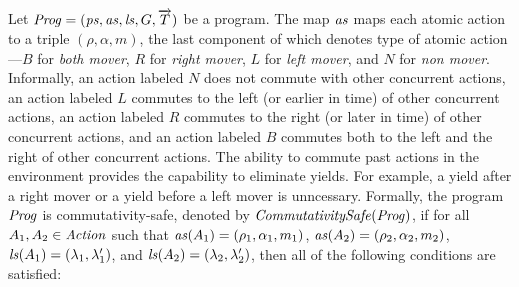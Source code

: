 Let $\mathit{Prog} = (\mathit{ps}, \mathit{as}, \mathit{ls}, G, \overrightarrow{T})$ be a program.
The map $\mathit{as}$ maps each atomic action to a triple $(\rho, \alpha, m)$, the last component of which 
denotes type of atomic action---$B$ for {\em both mover}, $R$ for {\em right mover}, $L$ for {\em left mover},
and $N$ for {\em non mover}.
Informally, an action labeled $N$ does not commute with other concurrent actions,
an action labeled $L$ commutes to the left (or earlier in time) of other concurrent actions,
an action labeled $R$ commutes to the right (or later in time) of other concurrent actions,
and an action labeled $B$ commutes both to the left and the right of other concurrent actions.
The ability to commute past actions in the environment provides the capability to eliminate yields.
For example, a yield after a right mover or a yield before a left mover is unncessary.
Formally, the program $\mathit{Prog}$ is commutativity-safe, denoted by $\mathit{CommutativitySafe}(\mathit{Prog})$,
if for all $A_1,A_2 \in \mathit{Action}$ such that $\mathit{as}(A_1) = (\rho_1,\alpha_1,m_1)$, $\mathit{as}(A_2) = (\rho_2,\alpha_2,m_2)$,
$\mathit{ls}(A_1) = (\lambda_1,\lambda'_1)$, and $\mathit{ls}(A_2) = (\lambda_2,\lambda'_2)$, 
then all of the following conditions are satisfied:
